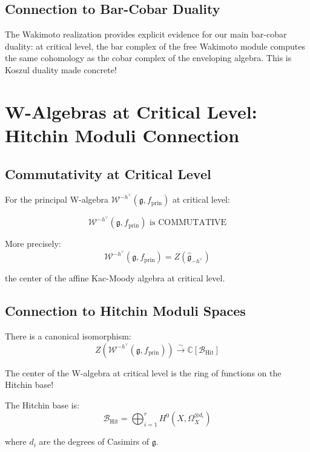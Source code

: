 \subsection{Connection to Bar-Cobar Duality}

\begin{remark}
The Wakimoto realization provides explicit evidence for our main bar-cobar duality: 
at critical level, the bar complex of the free Wakimoto module computes the same 
cohomology as the cobar complex of the enveloping algebra. This is Koszul duality made concrete!
\end{remark}


\section{W-Algebras at Critical Level: Hitchin Moduli Connection}
\label{sec:w-algebras-critical-level}

\subsection{Commutativity at Critical Level}

\begin{theorem}
\label{thm:w-algebra-critical-commutative}
For the principal W-algebra $\mathcal{W}^{-h^{\vee}}(\mathfrak{g}, f_{\text{prin}})$ at critical level:

$$\mathcal{W}^{-h^{\vee}}(\mathfrak{g}, f_{\text{prin}}) \text{ is COMMUTATIVE}$$

More precisely:
$$\mathcal{W}^{-h^{\vee}}(\mathfrak{g}, f_{\text{prin}}) = Z(\widehat{\mathfrak{g}}_{-h^{\vee}})$$

the center of the affine Kac-Moody algebra at critical level.
\end{theorem}

\subsection{Connection to Hitchin Moduli Spaces}

\begin{theorem}
\label{thm:arakawa-w-hitchin}
There is a canonical isomorphism:
$$Z(\mathcal{W}^{-h^{\vee}}(\mathfrak{g}, f_{\text{prin}})) \xrightarrow{\sim} \mathbb{C}[\mathcal{B}_{\text{Hit}}]$$

The center of the W-algebra at critical level is the ring of functions on the Hitchin base!

The Hitchin base is:
$$\mathcal{B}_{\text{Hit}} = \bigoplus_{i=1}^{r} H^0(X, \Omega_X^{\otimes d_i})$$

where $d_i$ are the degrees of Casimirs of $\mathfrak{g}$.
\end{theorem}

